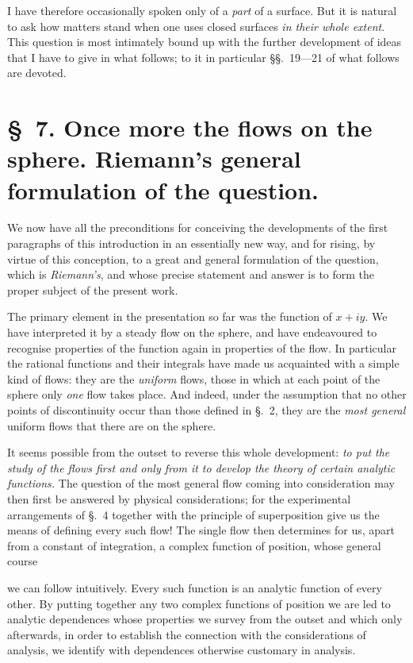 \documentclass{article}
\begin{document}
I have therefore occasionally spoken only of a \emph{part} of a surface. But it is natural to ask how matters stand when one uses closed surfaces \emph{in their whole extent}. This question is most intimately bound up with the further development of ideas that I have to give in what follows; to it in particular §§.~19---21 of what follows are devoted.

\section*{§~7. Once more the flows on the sphere. Riemann's general formulation of the question.}

We now have all the preconditions for conceiving the developments of the first paragraphs of this introduction in an essentially new way, and for rising, by virtue of this conception, to a great and general formulation of the question, which is \emph{Riemann's}, and whose precise statement and answer is to form the proper subject of the present work.

The primary element in the presentation so far was the function of $x + iy$. We have interpreted it by a steady flow on the sphere, and have endeavoured to recognise properties of the function again in properties of the flow. In particular the rational functions and their integrals have made us acquainted with a simple kind of flows: they are the \emph{uniform} flows, those in which at each point of the sphere only \emph{one} flow takes place. And indeed, under the assumption that no other points of discontinuity occur than those defined in §.~2, they are the \emph{most general} uniform flows that there are on the sphere.

It seems possible from the outset to reverse this whole development: \emph{to put the study of the flows first and only from it to develop the theory of certain analytic functions.} The question of the most general flow coming into consideration may then first be answered by physical considerations; for the experimental arrangements of §.~4 together with the principle of superposition give us the means of defining every such flow! The single flow then determines for us, apart from a constant of integration, a complex function of position, whose general course

we can follow intuitively. Every such function is an analytic function of every other. By putting together any two complex functions of position we are led to analytic dependences whose properties we survey from the outset and which only afterwards, in order to establish the connection with the considerations of analysis, we identify with dependences otherwise customary in analysis.
\end{document}
